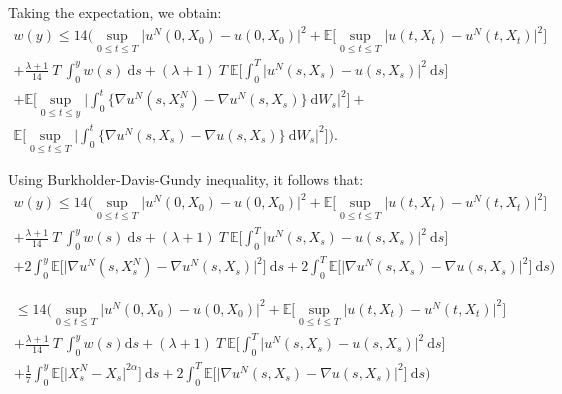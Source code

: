 \documentclass{article}[12pt]
\newcommand{\E}{\mathbb{E}}
\newcommand{\di}{\mathrm{d}}
\begin{document}
        Taking the expectation, we obtain:
        \begin{multline*}
        w(y) \leq 14\Bigg(\underset{0\leq t\leq T}{\sup}\Big|u^N(0,X_0) - u(0,X_0)\Big|^2 + \E\bigg[\underset{0\leq t\leq T}{\sup}\Big|u(t,X_t) - u^N(t,X_t)\Big|^2\bigg]\\ + \frac{\lambda+1}{14}\ T\ \int_0^y w(s)\ \di s + (\lambda+1)\ T\ \E\bigg[\int_0^T \big|u^N(s,X_s) - u(s,X_s)\big|^2\ \di s\bigg]\\ +\E\bigg[ \underset{0\leq t\leq y}{\sup}\bigg|\int_0^t \{\nabla u^N(s,X_s^N) - \nabla u^N(s,X_s)\}\ \di W_s\bigg|^2 \bigg] +\\ \E\bigg[ \underset{0\leq t\leq T}{\sup}\bigg|\int_0^t \{\nabla u^N(s,X_s) - \nabla u(s,X_s)\}\ \di W_s\bigg|^2 \bigg]\Bigg).
        \end{multline*}
        
        Using Burkholder-Davis-Gundy inequality, it follows that:
        \begin{multline*}
        w(y) \leq 14\Bigg(\underset{0\leq t\leq T}{\sup}\Big|u^N(0,X_0) - u(0,X_0)\Big|^2 + \E\bigg[\underset{0\leq t\leq T}{\sup}\Big|u(t,X_t) - u^N(t,X_t)\Big|^2\bigg]\\ + \frac{\lambda+1}{14}\ T\ \int_0^y w(s)\ \di s + (\lambda+1)\ T\ \E\bigg[\int_0^T \big|u^N(s,X_s) - u(s,X_s)\big|^2\ \di s\bigg]\\ +2\int_0^y \E\bigg[\Big|\nabla u^N(s,X_s^N) - \nabla u^N(s,X_s)\Big|^2\bigg]\ \di s +2\int_0^T \E\bigg[\Big|\nabla u^N(s,X_s) - \nabla u(s,X_s)\Big|^2\bigg]\ \di s\Bigg)
        \end{multline*}
        
        \begin{multline*}
        \leq 14\Bigg(\underset{0\leq t\leq T}{\sup}\Big|u^N(0,X_0) - u(0,X_0)\Big|^2 + \E\bigg[\underset{0\leq t\leq T}{\sup}\Big|u(t,X_t) - u^N(t,X_t)\Big|^2\bigg]\\ + \frac{\lambda+1}{14}\ T\ \int_0^y w(s) \di s + (\lambda+1)\ T\ \E\bigg[\int_0^T \big|u^N(s,X_s) - u(s,X_s)\big|^2\ \di s\bigg]\\ +\frac{1}{7}\int_0^y\E\bigg[ \Big|X_s^N - X_s\Big|^{2\alpha}\bigg]\ \di s +2\int_0^T \E\bigg[\Big|\nabla u^N(s,X_s) - \nabla u(s,X_s)\Big|^2\bigg]\ \di s\Bigg)
        \end{multline*}
        
\end{document}
